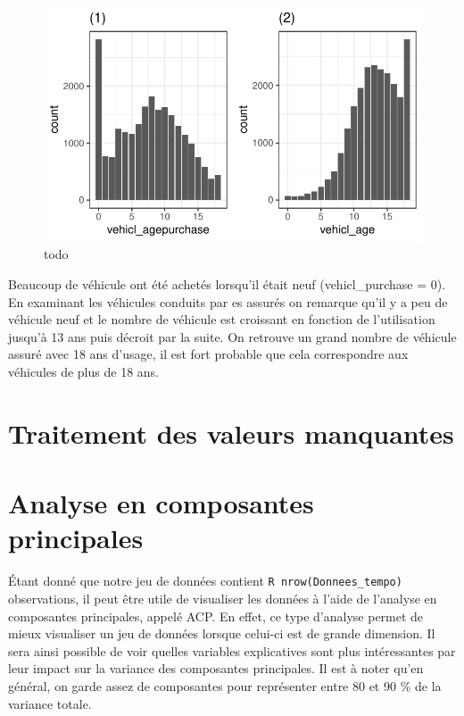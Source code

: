 \documentclass[
]{article}
\begin{document}
\begin{figure}

{\centering \includegraphics{01-01-Pretraitement_files/figure-latex/graph_age-1} 

}

\caption{\label{fig:}todo}\label{fig:graph_age}
\end{figure}

Beaucoup de véhicule ont été achetés lorsqu'il était neuf
(vehicl\_purchase = 0). En examinant les véhicules conduits par es
assurés on remarque qu'il y a peu de véhicule neuf et le nombre de
véhicule est croissant en fonction de l'utilisation jusqu'à 13 ans puis
décroit par la suite. On retrouve un grand nombre de véhicule assuré
avec 18 ans d'usage, il est fort probable que cela correspondre aux
véhicules de plus de 18 ans.

\newpage

\hypertarget{traitement-des-valeurs-manquantes}{%
\section{Traitement des valeurs
manquantes}\label{traitement-des-valeurs-manquantes}}

\newpage

\hypertarget{analyse-en-composantes-principales}{%
\section{Analyse en composantes
principales}\label{analyse-en-composantes-principales}}

Étant donné que notre jeu de données contient
\texttt{R\ nrow(Donnees\_tempo)} observations, il peut être utile de
visualiser les données à l'aide de l'analyse en composantes principales,
appelé ACP. En effet, ce type d'analyse permet de mieux visualiser un
jeu de données lorsque celui-ci est de grande dimension. Il sera ainsi
possible de voir quelles variables explicatives sont plus intéressantes
par leur impact sur la variance des composantes principales. Il est à
noter qu'en général, on garde assez de composantes pour représenter
entre 80 et 90 \% de la variance totale.
\end{document}
